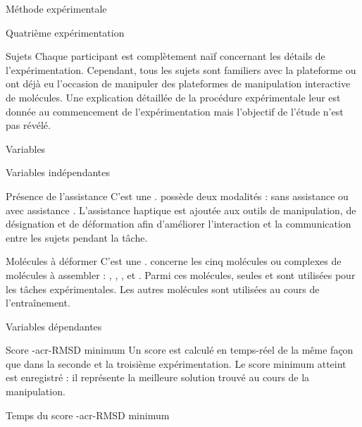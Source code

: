 \documentclass[myfrancais,ngerman,english,french]{mythesis}
\begin{document}
\begin{mychapter}{Méthode expérimentale}
\begin{mysection}{Quatrième expérimentation}
\begin{mysubsection}{Sujets}
				Chaque participant est complètement naïf concernant les détails de l'expérimentation.
				Cependant, tous les sujets sont familiers avec la plateforme \myShaddock ou ont déjà eu l'occasion de manipuler des plateformes de manipulation interactive de molécules.
				Une explication détaillée de la procédure expérimentale leur est donnée au commencement de l'expérimentation mais l'objectif de l'étude n'est pas révélé.
			\end{mysubsection}
			\begin{mysubsection}{Variables}
				\begin{mysubsubsection}{Variables indépendantes}
					\begin{myparagraph}{ Présence de l'assistance}
						C'est une .
						 possède deux modalités : \og sans assistance \fg ou \og avec assistance \fg.
						L'assistance haptique est ajoutée aux outils de manipulation, de désignation et de déformation afin d'améliorer l'interaction et la communication entre les sujets pendant la tâche.
					\end{myparagraph}
					\begin{myparagraph}{ Molécules à déformer}
						C'est une \myglos{glo-VariableIntraSujets}.
						 concerne les cinq molécules ou complexes de molécules à assembler : \og \myTRPCAGE \fg, \og \myPrion \fg, \og \myUbiquitin \fg, \og \myTRPZIPPER \fg et \og \myNusENusG \fg.
						Parmi ces molécules, seules \myUbiquitin et \myNusENusG sont utilisées pour les tâches expérimentales.
						Les autres molécules sont  utilisées au cours de l'entraînement.
					\end{myparagraph}
				\end{mysubsubsection}
				\begin{mysubsubsection}{Variables dépendantes}
					\begin{myparagraph}{ Score \myacronl-{acr-RMSD} minimum}
						Un score  est calculé en temps-réel de la même façon que dans la seconde et la troisième expérimentation.
						Le score minimum atteint est enregistré : il représente la meilleure solution trouvé au cours de la manipulation.
					\end{myparagraph}
					\begin{myparagraph}{ Temps du score \myacronl-{acr-RMSD} minimum}

\end{myparagraph}
\end{mysubsubsection}
\end{mysubsection}
\end{mysection}
\end{mychapter}
\end{document}
